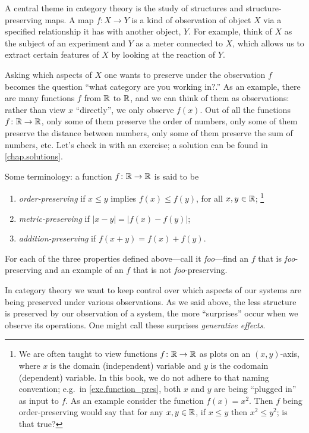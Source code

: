 \documentclass[7Sketches]{subfiles}
\begin{document}
A central theme in category theory is the study of structures and
structure-preserving maps.%
 A map $f\colon X\to Y$ is a kind of observation of object $X$ via a specified relationship it has with another object, $Y$. For example, think of $X$ as the subject of an experiment and $Y$ as a meter connected to $X$, which allows us to extract certain features of $X$ by looking at the reaction of $Y$.

Asking which aspects of $X$ one wants
to preserve under the observation $f$ becomes the question ``what category are you working
in?.'' As an example, there are many functions $f$ from $\mathbb{R}$ to $\mathbb{R}$, and we can think of them as observations: rather than view $x$ ``directly'', we only observe $f(x)$. Out of all the functions $f\colon\mathbb{R}\to\mathbb{R}$, only
some of them preserve the order of numbers, only some of them preserve the distance between numbers, only
some of them preserve the sum of numbers, etc. Let's check in with an exercise; a solution can be found in \cref{chap.solutions}.

\begin{exercise}%
\label{exc.function_pres} %
%
Some terminology: a function $f\colon \mathbb{R}\to\mathbb{R}$ is said to be
\begin{enumerate}[label=(\alph*)]
	\item \emph{order-preserving} if $x\leq y$ implies $f(x)\leq f(y)$, for all $x,y\in\mathbb{R}$;%
	\footnote{We are often taught to view functions $f\colon\mathbb{R}\to\mathbb{R}$ as plots on an $(x,y)$-axis, where $x$ is the domain (independent) variable and $y$ is the codomain (dependent) variable. In this book, we do not adhere to that naming convention; e.g.\ in \cref{exc.function_pres}, both $x$ and $y$ are being ``plugged in'' as input to $f$. As an example consider the function $f(x)=x^2$. Then $f$ being order-preserving would say that for any $x,y\in\mathbb{R}$, if $x\leq y$ then $x^2\leq y^2$; is that true?}
	\item \emph{metric-preserving} if $|x-y|=|f(x)-f(y)|$;
	\item \emph{addition-preserving} if $f(x+y)=f(x)+f(y)$.
\end{enumerate}
For each of the three properties defined above---call it \emph{foo}---find an $f$ that is \emph{foo}-preserving and
an example of an $f$ that is not \emph{foo}-preserving.
\end{exercise}

In category theory we want to keep control over which aspects of our systems are being preserved under various observations. As we said above, the less structure is preserved by our observation of a system, the more ``surprises'' occur when we observe its operations. One might call these surprises \emph{generative effects}.
%
\end{document}
